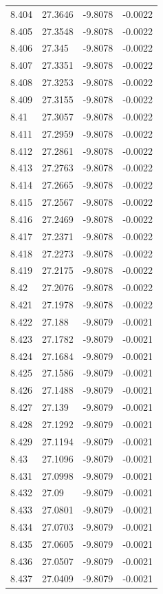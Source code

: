 \begin{tabular}{llll}
8.404 & 27.3646 & -9.8078 & -0.0022 \\
8.405 & 27.3548 & -9.8078 & -0.0022 \\
8.406 & 27.345 & -9.8078 & -0.0022 \\
8.407 & 27.3351 & -9.8078 & -0.0022 \\
8.408 & 27.3253 & -9.8078 & -0.0022 \\
8.409 & 27.3155 & -9.8078 & -0.0022 \\
8.41 & 27.3057 & -9.8078 & -0.0022 \\
8.411 & 27.2959 & -9.8078 & -0.0022 \\
8.412 & 27.2861 & -9.8078 & -0.0022 \\
8.413 & 27.2763 & -9.8078 & -0.0022 \\
8.414 & 27.2665 & -9.8078 & -0.0022 \\
8.415 & 27.2567 & -9.8078 & -0.0022 \\
8.416 & 27.2469 & -9.8078 & -0.0022 \\
8.417 & 27.2371 & -9.8078 & -0.0022 \\
8.418 & 27.2273 & -9.8078 & -0.0022 \\
8.419 & 27.2175 & -9.8078 & -0.0022 \\
8.42 & 27.2076 & -9.8078 & -0.0022 \\
8.421 & 27.1978 & -9.8078 & -0.0022 \\
8.422 & 27.188 & -9.8079 & -0.0021 \\
8.423 & 27.1782 & -9.8079 & -0.0021 \\
8.424 & 27.1684 & -9.8079 & -0.0021 \\
8.425 & 27.1586 & -9.8079 & -0.0021 \\
8.426 & 27.1488 & -9.8079 & -0.0021 \\
8.427 & 27.139 & -9.8079 & -0.0021 \\
8.428 & 27.1292 & -9.8079 & -0.0021 \\
8.429 & 27.1194 & -9.8079 & -0.0021 \\
8.43 & 27.1096 & -9.8079 & -0.0021 \\
8.431 & 27.0998 & -9.8079 & -0.0021 \\
8.432 & 27.09 & -9.8079 & -0.0021 \\
8.433 & 27.0801 & -9.8079 & -0.0021 \\
8.434 & 27.0703 & -9.8079 & -0.0021 \\
8.435 & 27.0605 & -9.8079 & -0.0021 \\
8.436 & 27.0507 & -9.8079 & -0.0021 \\
8.437 & 27.0409 & -9.8079 & -0.0021 \\

\end{tabular}
